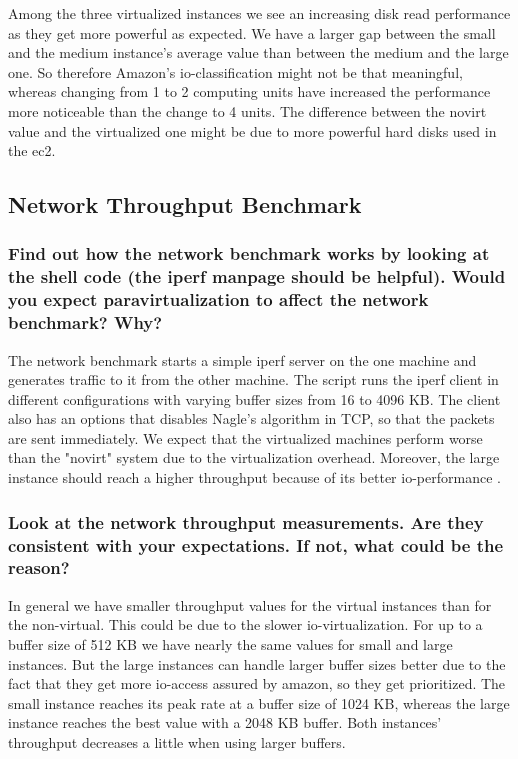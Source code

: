 \documentclass{article}
\begin{document}
Among the three virtualized instances we see an increasing disk read performance as they get more powerful as expected. We have a larger gap between the small and the medium instance's average value than between the medium and the large one. So therefore Amazon's io-classification might not be that meaningful, whereas changing from 1 to 2 computing units have increased the performance more noticeable than the change to 4 units.
The difference between the novirt value and the virtualized one might be due to more powerful hard disks used in the ec2.

\subsection{Network Throughput Benchmark}

	\subsubsection{Find out how the network benchmark works by looking at the shell code (the iperf manpage should be helpful). Would you expect paravirtualization to affect the network benchmark? Why?} 

The network benchmark starts a simple iperf server on the one machine and generates traffic to it from the other machine. The script runs the iperf client in different configurations with varying buffer sizes from 16 to 4096 KB. The client also has an options that disables Nagle's algorithm in TCP, so that the packets are sent immediately. We expect that the virtualized machines perform worse than the "novirt" system due to the virtualization overhead. Moreover, the large instance should reach a higher throughput because of its better io-performance \cite{aws}.


	\subsubsection{Look at the network throughput measurements. Are they consistent with your expectations. If not, what could be the reason?}

In general we have smaller throughput values for the virtual instances than for the non-virtual. This could be due to the slower io-virtualization. For up to a buffer size of 512 KB we have nearly the same values for small and large instances. But the large instances can handle larger buffer sizes better due to the fact that they get more io-access assured by amazon, so they get prioritized. The small instance reaches its peak rate at a buffer size of 1024 KB, whereas the large instance reaches the best value with a 2048 KB buffer. Both instances' throughput decreases a little when using larger buffers.


\end{document}
